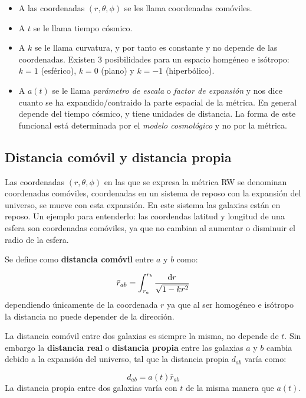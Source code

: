 \begin{itemize}
	\item A las coordenadas $(r,\theta,\phi)$ se les llama coordenadas comóviles.
	\item A $t$ se le llama tiempo cósmico.
	\item A $k$ se le llama curvatura, y por tanto es constante y no depende de las coordenadas. Existen 3 posibilidades para un espacio homgéneo e isótropo: $k=1$ (esférico), $k=0$ (plano) y $k=-1$ (hiperbólico).
	\item A $a(t)$ se le llama \textit{parámetro de escala} o \textit{factor de expansión} y nos dice cuanto se ha expandido/contraido la parte espacial de la métrica. En general depende del tiempo cósmico, y tiene unidades de distancia.
	      La forma de este funcional está determinada por el \textit{modelo cosmológico} y no por la métrica.
\end{itemize}


\subsection{Distancia comóvil y distancia propia}

Las coordenadas $(r,\theta,\phi)$ en las que se expresa la métrica RW se denominan coordenadas comóviles, coordenadas en un sistema de reposo con la expansión del universo, se mueve con esta expansión. En este sistema las galaxias están en reposo. Un ejemplo para entenderlo: las coordendas latitud y longitud de una esfera son coordenadas comóviles, ya que no cambian al aumentar o disminuir el radio de la esfera.

Se define como \textbf{distancia comóvil} entre $a$ y $b$ como:

\begin{equation}
	\bar{r}_{ab} = \int_{r_a}^{r_b} \frac{\mathrm{d} r}{\sqrt{1-kr^2}}
\end{equation}
dependiendo únicamente de la coordenada $r$ ya que al ser homogéneo e isótropo la distancia no puede depender de la dirección.

La distancia comóvil entre dos galaxias es siempre la misma, no depende de $t$. Sin embargo la  \textbf{distancia real} o \textbf{distancia propia} entre las galaxias $a$ y $b$ cambia debido a la expansión del universo, tal que la distancia propia $d_{ab}$ varía como:

\begin{equation}
	d_{ab} = a(t) \bar{r}_{ab}
\end{equation}
La distancia propia entre dos galaxias varía con $t$ de la misma manera que $a(t)$.


